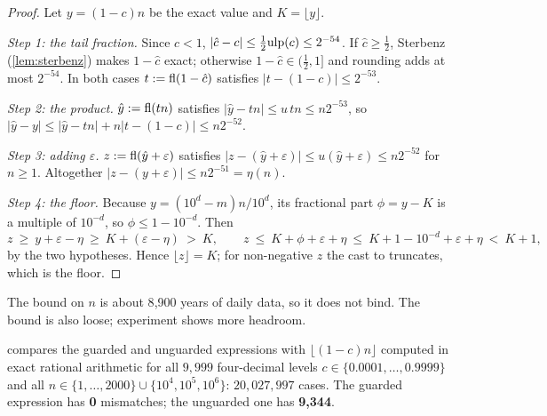 \begin{proof}
Let $y=(1-c)n$ be the exact value and $K=\lfloor y\rfloor$.

\emph{Step 1: the tail fraction.} Since $c<1$, $|\hat c-c|\le\frac12\mathrm{ulp}(c)\le2^{-54}$. If $\hat c\ge\frac12$, Sterbenz
(\cref{lem:sterbenz}) makes $1-\hat c$ exact; otherwise $1-\hat c\in(\frac12,1]$ and rounding adds at most $2^{-54}$. In
both cases $t:=\mathrm{fl}(1-\hat c)$ satisfies $|t-(1-c)|\le2^{-53}$.

\emph{Step 2: the product.} $\hat y:=\mathrm{fl}(tn)$ satisfies $|\hat y-tn|\le u\,tn\le n2^{-53}$, so
$|\hat y-y|\le|\hat y-tn|+n|t-(1-c)|\le n2^{-52}$.

\emph{Step 3: adding $\varepsilon$.} $z:=\mathrm{fl}(\hat y+\varepsilon)$ satisfies $|z-(\hat y+\varepsilon)|\le u(\hat y+\varepsilon)\le n2^{-52}$
for $n\ge1$. Altogether $|z-(y+\varepsilon)|\le n2^{-51}=\eta(n)$.

\emph{Step 4: the floor.} Because $y=(10^d-m)n/10^d$, its fractional part $\phi=y-K$ is a multiple of $10^{-d}$, so
$\phi\le1-10^{-d}$. Then
\[ z\ \ge\ y+\varepsilon-\eta\ \ge\ K+(\varepsilon-\eta)\ >\ K,\qquad
   z\ \le\ K+\phi+\varepsilon+\eta\ \le\ K+1-10^{-d}+\varepsilon+\eta\ <\ K+1, \]
by the two hypotheses. Hence $\lfloor z\rfloor=K$; for non-negative $z$ the cast to  truncates, which is the floor.
\end{proof}


The bound on $n$ is about 8{,}900 years of daily data, so it does not bind. The bound is also loose; experiment shows more
headroom.

\begin{verified}
 compares the guarded and unguarded expressions with $\lfloor(1-c)n\rfloor$ computed in exact rational
arithmetic for all $9{,}999$ four-decimal levels $c\in\{0.0001,\dots,0.9999\}$ and all
$n\in\{1,\dots,2000\}\cup\{10^4,10^5,10^6\}$: $20{,}027{,}997$ cases. The guarded expression has \textbf{0} mismatches;
the unguarded one has \textbf{9{,}344}.
\end{verified}

